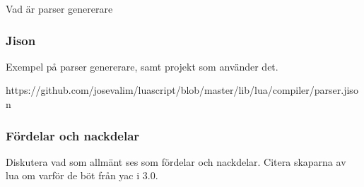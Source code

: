 Vad är parser genererare

\subsubsection{Jison}

Exempel på parser genererare, samt projekt som använder det.

https://github.com/josevalim/luascript/blob/master/lib/lua/compiler/parser.jison

\subsubsection{Fördelar och nackdelar}

Diskutera vad som allmänt ses som fördelar och nackdelar. Citera skaparna av
lua om varför de böt från yac i 3.0.

%
%
%


